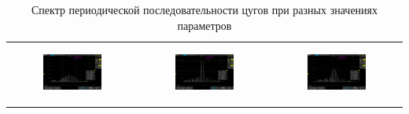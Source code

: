 \documentclass[a4paper,12pt]{article} %
\begin{document}
\begin{table}[ht]
\begin{tabular}{ccc}
\newline
\begin{subfigure}{0.3\textwidth}\centering\includegraphics[width=\columnwidth]{II/AKIP0015.png}\end{subfigure} &
\begin{subfigure}{0.3\textwidth}\centering\includegraphics[width=\columnwidth]{II/AKIP0016.png}\end{subfigure} &
\begin{subfigure}{0.3\textwidth}\centering\includegraphics[width=\columnwidth]{II/AKIP0017.png}\end{subfigure} \\
\end{tabular}
\caption{Спектр периодической последовательности цугов при разных значениях параметров}
\label{tab:picsII}
\end{table}
\end{document}
